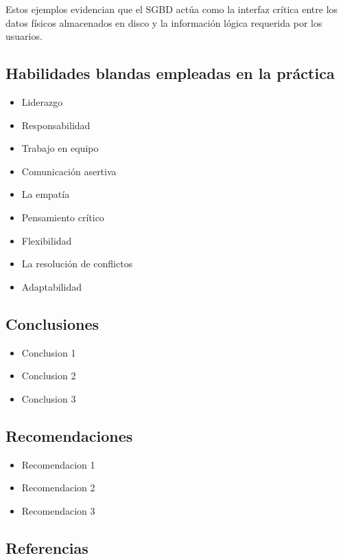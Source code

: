 \documentclass{article}
\begin{document}
Estos ejemplos evidencian que el SGBD actúa como la interfaz crítica entre los datos físicos almacenados en disco y la información lógica requerida por los usuarios.


\subsection{Habilidades blandas empleadas en la práctica}

\begin{itemize}
    \item[$\square$]  Liderazgo
    \item[$\square$]  Responsabilidad
    \item[$\checkmark$] Trabajo en equipo
    \item[$\square$] Comunicación asertiva
    \item[$\square$] La empatía
    \item[$\square$]  Pensamiento crítico
    \item[$\square$] Flexibilidad
    \item[$\square$] La resolución de conflictos
    \item[$\square$] Adaptabilidad
\end{itemize}

\subsection{Conclusiones}
\begin{itemize}
    \item Conclusion 1
    \item Conclusion 2
    \item Conclusion 3
\end{itemize}
\subsection{Recomendaciones}
\begin{itemize}
    \item Recomendacion 1
    \item Recomendacion 2
    \item Recomendacion 3
\end{itemize}
\subsection{Referencias}
\vspace{-3em}
\renewcommand{\refname}{}
\nocite{*}



\vfill
\end{document}
